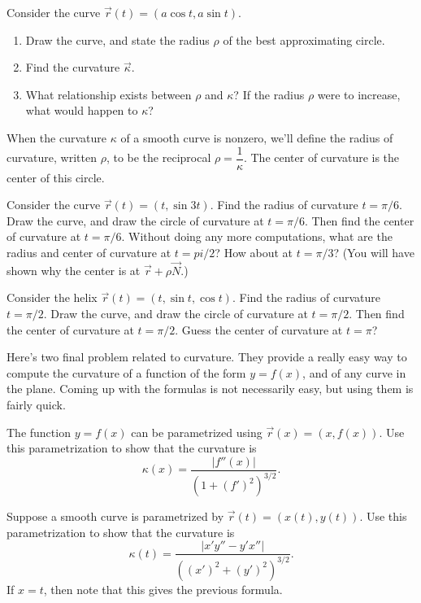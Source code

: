 \begin{problem}
 Consider the curve $\vec r(t)=(a\cos t, a\sin t)$.
 \begin{enumerate}
  \item Draw the curve, and state the radius $\rho$ of the best approximating circle.
  \item Find the curvature $\vec \kappa$.
  \item What relationship exists between $\rho$ and $\kappa$?  If the radius $\rho$ were to increase, what would happen to $\kappa$?
 \end{enumerate}

\end{problem}


\begin{definition}
When the curvature $\kappa$ of a smooth curve is nonzero, we'll define the radius of curvature, written $\rho$, to be the reciprocal $\rho = \dfrac{1}{\kappa}$. The center of curvature is the center of this circle.
\end{definition}

\begin{problem}
 Consider the curve $\vec r(t)=(t,\sin 3 t)$. Find the radius of curvature $t=\pi/6$. Draw the curve, and draw the circle of curvature at $t=\pi/6$. Then find the center of curvature at $t=\pi/6$. Without doing any more computations, what are the radius and center of curvature at $t=pi/2$?  How about at $t=\pi/3$? (You will have shown why the center is at $\vec r + \rho \vec N$.)
\end{problem}

\begin{problem}
 Consider the helix $\vec r(t)=(t,\sin t,\cos t)$. Find the radius of curvature $t=\pi/2$. Draw the curve, and draw the circle of curvature at $t=\pi/2$. Then find the center of curvature at $t=\pi/2$. Guess the center of curvature at $t=\pi$?
\end{problem}

Here's two final problem related to curvature.  They provide a really easy way to compute the curvature of a function of the form $y=f(x)$, and of any curve in the plane. Coming up with the formulas is not necessarily easy, but using them is fairly quick.  
\begin{problem}
 The function $y=f(x)$ can be parametrized using $\vec r(x) = (x,f(x))$.  Use this parametrization to show that the curvature is $$\kappa(x) = \frac{|f''(x)|}{(1+(f')^2)^{3/2}}.$$
\end{problem}
\begin{problem}[Optional]
 Suppose a smooth curve is parametrized by $\vec r(t) = (x(t),y(t))$.  Use this parametrization to show that the curvature is $$\kappa(t) = \frac{|x'y''-y'x''|}{((x')^2+(y')^2)^{3/2}}.$$ If $x=t$, then note that this gives the previous formula.
\end{problem}


